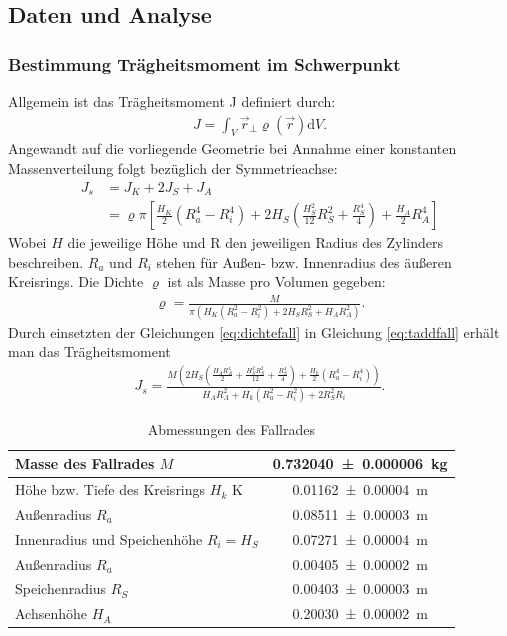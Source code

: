 \subsection{Daten und Analyse} %

\subsubsection{Bestimmung Trägheitsmoment im Schwerpunkt}

Allgemein ist das Trägheitsmoment J definiert durch:
\begin{align}
J= \int_{V} \vec{r}_{\perp} \varrho (\vec{r}) \mathrm{d}V.
\end{align}
Angewandt auf die vorliegende Geometrie bei Annahme einer konstanten Massenverteilung folgt bezüglich der Symmetrieachse: 
\begin{align}
J_s&= J_{K}+2J_{S}+J_{A}\\
&=\varrho \pi \left[\frac{H_K}{2} (R_a^4-R_i^4)+  2 H_S(\frac{H_S^2}{12} R_S^2+\frac{R_S^4}{4})+  \frac{H_A}{2}R_A^4  \right] \label{eq:taddfall}
\end{align}	
Wobei $H$ die jeweilige Höhe und R den jeweiligen Radius des Zylinders beschreiben. $R_a$ und $R_i$ stehen für Außen- bzw. Innenradius des äußeren Kreisrings. Die Dichte $\varrho$ ist als Masse pro Volumen gegeben:
\begin{align}
	\varrho=\frac{M}{\pi(H_K  (R_a^2-R_i^2)+2 H_S  R_S^2+ H_A  R_A^2)}. \label{eq:dichtefall}
\end{align} 
Durch einsetzten der Gleichungen \ref{eq:dichtefall} in Gleichung \ref{eq:taddfall} erhält man das Trägheitsmoment
\begin{align}
J_s=\frac{M \left(2 H_{S} \left(\frac{H_{A} R_{A}^{4}}{2} + \frac{H_{S}^{2} R_{S}^{2}}{12} + \frac{R_{S}^{4}}{4}\right) + \frac{ H_{k}}{2} \left(R_{a}^{4} - R_{i}^{4}\right)\right)}{H_{A} R_{A}^{2} + H_{k} \left(R_{a}^{2} - R_{i}^{2}\right) + 2 R_{S}^{2} R_{i}} \label{eq:Jfall}.
\end{align}



\begin{table}
	\caption{Abmessungen des Fallrades}
	\begin{tabular}{|l|c|}
	\hline 
	Masse des Fallrades $M$& \SI{0.732040\pm 0.000006}{kg} \\ 
	\hline 
	Höhe bzw. Tiefe des Kreisrings $H_k$ K& \SI{0.01162\pm 0.00004}{m} \\ 
	\hline 
	Außenradius $R_a$ & \SI{0.08511\pm 0.00003}{m} \\ 
	\hline 
	Innenradius und Speichenhöhe $R_i=H_S$ & \SI{0.07271\pm 0.00004}{m}  \\ 
	\hline 
	Außenradius $R_a$	& \SI{0.00405 \pm 0.00002}{m} \\ 
	\hline 
	Speichenradius $R_S$& \SI{0.00403 \pm 0.00003}{m} \\ 
	\hline 
	Achsenhöhe $H_A$& \SI{0.20030\pm 0.00002}{m} \\ 
	\hline 

\end{tabular}
\label{tab:datafall} 
\end{table}



